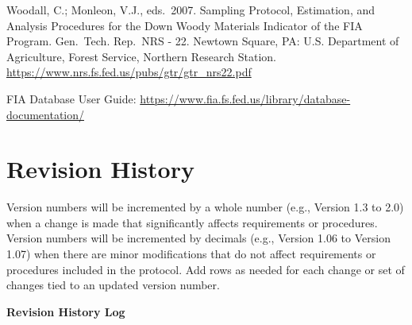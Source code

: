 \documentclass[
]{book}
\begin{document}
Woodall, C.; Monleon, V.J., eds.~2007. Sampling Protocol, Estimation, and Analysis Procedures for the Down Woody Materials Indicator of the FIA Program. Gen.~Tech. Rep.~NRS - 22. Newtown Square, PA: U.S. Department of Agriculture, Forest Service, Northern Research Station. \url{https://www.nrs.fs.fed.us/pubs/gtr/gtr_nrs22.pdf}

FIA Database User Guide: \url{https://www.fia.fs.fed.us/library/database-documentation/}

\hypertarget{revision-history}{%
\chapter{Revision History}\label{revision-history}}

Version numbers will be incremented by a whole number (e.g., Version 1.3 to 2.0) when a change is made that significantly affects requirements or procedures. Version numbers will be incremented by decimals (e.g., Version 1.06 to Version 1.07) when there are minor modifications that do not affect requirements or procedures included in the protocol. Add rows as needed for each change or set of changes tied to an updated version number.

\textbf{Revision History Log}
\end{document}
